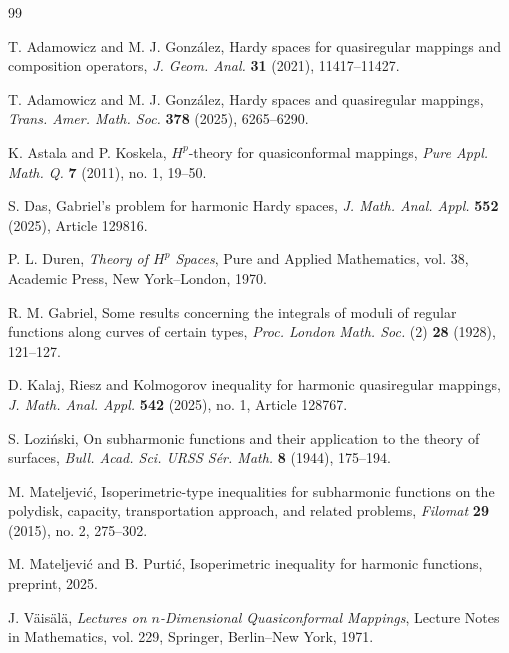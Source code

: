 \documentclass[11pt]{article}
\theoremstyle{definition}
\theoremstyle{remark}
\begin{document}
\begin{thebibliography}{99}

T. Adamowicz and M. J. Gonz\'alez,
\newblock Hardy spaces for quasiregular mappings and composition operators,
\newblock \emph{J. Geom. Anal.} \textbf{31} (2021), 11417--11427.

T. Adamowicz and M. J. Gonz\'alez,
\newblock Hardy spaces and quasiregular mappings,
\newblock \emph{Trans. Amer. Math. Soc.} \textbf{378} (2025), 6265--6290.

K. Astala and P. Koskela,
\newblock $H^p$-theory for quasiconformal mappings,
\newblock \emph{Pure Appl. Math. Q.} \textbf{7} (2011), no. 1, 19--50.

S. Das,
\newblock Gabriel's problem for harmonic Hardy spaces,
\newblock \emph{J. Math. Anal. Appl.} \textbf{552} (2025), Article 129816.

P. L. Duren,
\newblock \emph{Theory of $H^p$ Spaces},
\newblock Pure and Applied Mathematics, vol. 38, Academic Press, New York--London, 1970.

R. M. Gabriel,
\newblock Some results concerning the integrals of moduli of regular functions along curves of certain types,
\newblock \emph{Proc. London Math. Soc.} (2) \textbf{28} (1928), 121--127.

D. Kalaj,
\newblock Riesz and Kolmogorov inequality for harmonic quasiregular mappings,
\newblock \emph{J. Math. Anal. Appl.} \textbf{542} (2025), no. 1, Article 128767.

S. Lozi\'nski,
\newblock On subharmonic functions and their application to the theory of surfaces,
\newblock \emph{Bull. Acad. Sci. URSS S\'er. Math.} \textbf{8} (1944), 175--194.

M. Mateljevi\'c,
\newblock Isoperimetric-type inequalities for subharmonic functions on the polydisk, capacity, transportation approach, and related problems,
\newblock \emph{Filomat} \textbf{29} (2015), no. 2, 275--302.

M. Mateljevi\'c and B. Purti\'c,
\newblock Isoperimetric inequality for harmonic functions,
\newblock preprint, 2025.


J. V\"ais\"al\"a,
\newblock \emph{Lectures on $n$-Dimensional Quasiconformal Mappings},
\newblock Lecture Notes in Mathematics, vol. 229, Springer, Berlin--New York, 1971.

\end{thebibliography}
\end{document}
